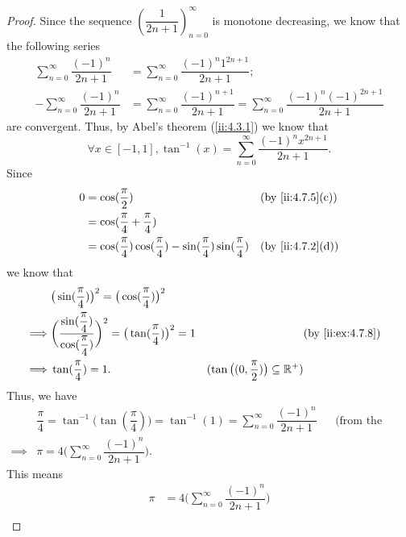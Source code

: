 \begin{proof}
  Since the sequence \((\dfrac{1}{2n + 1})_{n = 0}^\infty\) is monotone decreasing, we know that the following series
  \begin{align*}
    \sum_{n = 0}^\infty \dfrac{(-1)^n}{2n + 1}  & = \sum_{n = 0}^\infty \dfrac{(-1)^n 1^{2n + 1}}{2n + 1};                                                      \\
    -\sum_{n = 0}^\infty \dfrac{(-1)^n}{2n + 1} & = \sum_{n = 0}^\infty \dfrac{(-1)^{n + 1}}{2n + 1} = \sum_{n = 0}^\infty \dfrac{(-1)^n (-1)^{2n + 1}}{2n + 1}
  \end{align*}
  are convergent.
  Thus, by Abel's theorem (\cref{ii:4.3.1}) we know that
  \[
    \forall x \in [-1, 1], \tan^{-1}(x) = \sum_{n = 0}^\infty \dfrac{(-1)^n x^{2n + 1}}{2n + 1}.
  \]
  Since
  \begin{align*}
    0 & = \cos(\dfrac{\pi}{2})                                                                  &  & \by{ii:4.7.5}[c] \\
      & = \cos(\dfrac{\pi}{4} + \dfrac{\pi}{4})                                                                       \\
      & = \cos(\dfrac{\pi}{4}) \cos(\dfrac{\pi}{4}) - \sin(\dfrac{\pi}{4}) \sin(\dfrac{\pi}{4}) &  & \by{ii:4.7.2}[d]
  \end{align*}
  we know that
  \begin{align*}
             & \big(\sin(\dfrac{\pi}{4})\big)^2 = \big(\cos(\dfrac{\pi}{4})\big)^2                                                                                                             \\
    \implies & \bigg(\dfrac{\sin(\dfrac{\pi}{4})}{\cos(\dfrac{\pi}{4})}\bigg)^2 = \big(\tan(\dfrac{\pi}{4})\big)^2 = 1 &                                                    & \by{ii:ex:4.7.8} \\
    \implies & \tan(\dfrac{\pi}{4}) = 1.                                                                               & (\tan\big((0, \dfrac{\pi}{2})\big) \subseteq \R^+)
  \end{align*}
  Thus, we have
  \begin{align*}
             & \dfrac{\pi}{4} = \tan^{-1}\big(\tan(\dfrac{\pi}{4})\big) = \tan^{-1}(1) = \sum_{n = 0}^\infty \dfrac{(-1)^n}{2n + 1} &  & \text{(from the proof above)} \\
    \implies & \pi = 4 \bigg(\sum_{n = 0}^\infty \dfrac{(-1)^n}{2n + 1}\bigg).
  \end{align*}
  This means
  \begin{align*}
    \pi & = 4 \bigg(\sum_{n = 0}^\infty \dfrac{(-1)^n}{2n + 1}\bigg)                                                                                 \\

\end{align*}
\end{proof}
